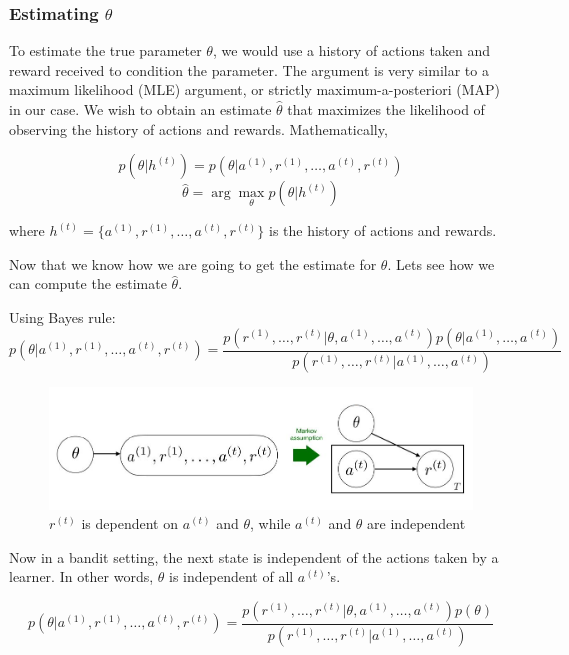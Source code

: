 \documentclass[11pt]{article}
\begin{document}
\subsubsection{Estimating $\theta$}

To estimate the true parameter $\theta$, we would use a history of actions taken and reward received to condition the parameter. The argument is very similar to a maximum likelihood (MLE) argument, or strictly maximum-a-posteriori (MAP) in our case. We wish to obtain an estimate $\hat{\theta}$ that maximizes the likelihood of observing the history of actions and rewards. Mathematically,

$$p(\theta | h^{(t)}) = p(\theta | a^{(1)}, r^{(1)}, \dots, a^{(t)}, r^{(t)})$$
$$\hat{\theta} = \arg \max_{\theta} p(\theta|h^{(t)})$$

where $h^{(t)} =\{a^{(1)}, r^{(1)}, \dots, a^{(t)}, r^{(t)}\}$ is the history of actions and rewards.

Now that we know how we are going to get the estimate for $\theta$. Lets see how we can compute the estimate $\hat{\theta}$.

Using Bayes rule:
$$p(\theta | a^{(1)}, r^{(1)}, \dots, a^{(t)}, r^{(t)}) = \frac{p(r^{(1)}, \dots, r^{(t)} | \theta, a^{(1)}, \dots, a^{(t)})p(\theta | a^{(1)}, \dots, a^{(t)})}{p(r^{(1)}, \dots, r^{(t)} | a^{(1)}, \dots, a^{(t)})}$$

\normalfont
\begin{figure}[t]
    \centering
    \includegraphics[scale=0.6]{images/markov.pdf}
    \caption{$r^{(t)}$ is dependent on $a^{(t)}$ and $\theta$, while $a^{(t)}$ and $\theta$ are independent}
    \label{fig:plate}
\end{figure}

Now in a bandit setting, the next state is independent of the actions taken by a learner. In other words, $\theta$ is independent of all $a^{(t)}$'s.

$$p(\theta | a^{(1)}, r^{(1)}, \dots, a^{(t)}, r^{(t)}) = \frac{p(r^{(1)}, \dots, r^{(t)} | \theta, a^{(1)}, \dots, a^{(t)})p(\theta)}{p(r^{(1)}, \dots, r^{(t)} | a^{(1)}, \dots, a^{(t)})}$$
\end{document}

